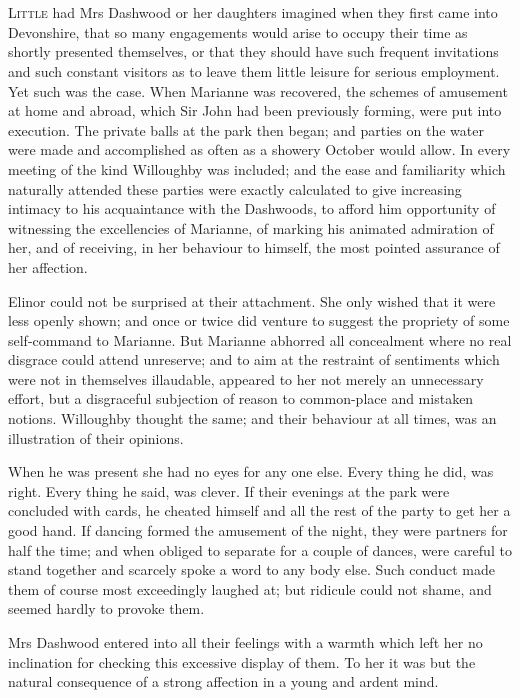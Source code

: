 \chapter[Chapter \thechapter]{}
\lettrine[lines=4,lraise=0.3]{L}{ittle} had Mrs Dashwood or her daughters imagined when they first came into Devonshire, that so many engagements would arise to occupy their time as shortly presented themselves, or that they should have such frequent invitations and such constant visitors as to leave them little leisure for serious employment. Yet such was the case. When Marianne was recovered, the schemes of amusement at home and abroad, which Sir John had been previously forming, were put into execution. The private balls at the park then began; and parties on the water were made and accomplished as often as a showery October would allow. In every meeting of the kind Willoughby was included; and the ease and familiarity which naturally attended these parties were exactly calculated to give increasing intimacy to his acquaintance with the Dashwoods, to afford him opportunity of witnessing the excellencies of Marianne, of marking his animated admiration of her, and of receiving, in her behaviour to himself, the most pointed assurance of her affection.

Elinor could not be surprised at their attachment. She only wished that it were less openly shown; and once or twice did venture to suggest the propriety of some self-command to Marianne. But Marianne abhorred all concealment where no real disgrace could attend unreserve; and to aim at the restraint of sentiments which were not in themselves illaudable, appeared to her not merely an unnecessary effort, but a disgraceful subjection of reason to common-place and mistaken notions. Willoughby thought the same; and their behaviour at all times, was an illustration of their opinions.

When he was present she had no eyes for any one else. Every thing he did, was right. Every thing he said, was clever. If their evenings at the park were concluded with cards, he cheated himself and all the rest of the party to get her a good hand. If dancing formed the amusement of the night, they were partners for half the time; and when obliged to separate for a couple of dances, were careful to stand together and scarcely spoke a word to any body else. Such conduct made them of course most exceedingly laughed at; but ridicule could not shame, and seemed hardly to provoke them.

Mrs Dashwood entered into all their feelings with a warmth which left her no inclination for checking this excessive display of them. To her it was but the natural consequence of a strong affection in a young and ardent mind.

